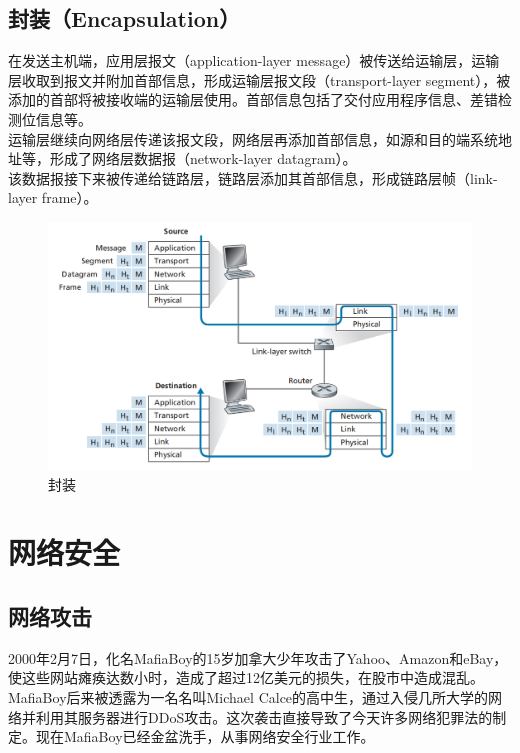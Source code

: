 \vspace{0.5cm}

\subsection{封装（Encapsulation）}

在发送主机端，应用层报文（application-layer message）被传送给运输层，运输层收取到报文并附加首部信息，形成运输层报文段（transport-layer segment），被添加的首部将被接收端的运输层使用。首部信息包括了交付应用程序信息、差错检测位信息等。\\

运输层继续向网络层传递该报文段，网络层再添加首部信息，如源和目的端系统地址等，形成了网络层数据报（network-layer datagram）。\\

该数据报接下来被传递给链路层，链路层添加其首部信息，形成链路层帧（link-layer frame）。\\

\begin{figure}[H]
    \centering
    \includegraphics[scale=0.4]{img/C1/1-3/1.png}
    \caption{封装}
\end{figure}

\newpage

\section{网络安全}

\subsection{网络攻击}

2000年2月7日，化名MafiaBoy的15岁加拿大少年攻击了Yahoo、Amazon和eBay，使这些网站瘫痪达数小时，造成了超过12亿美元的损失，在股市中造成混乱。MafiaBoy后来被透露为一名名叫Michael Calce的高中生，通过入侵几所大学的网络并利用其服务器进行DDoS攻击。这次袭击直接导致了今天许多网络犯罪法的制定。现在MafiaBoy已经金盆洗手，从事网络安全行业工作。\\


